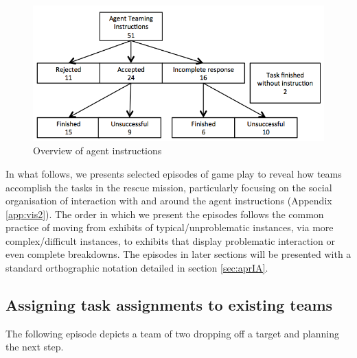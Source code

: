 \begin{figure}[ht]
 \includegraphics[width=1\textwidth]{img/study2/system/agentInstructions}
\caption{Overview of agent instructions}
\label{fig:study2agentInstructions}
\end{figure}

In what follows, we presents selected episodes of game play to reveal how teams accomplish the tasks in the rescue mission, particularly focusing on the social organisation of interaction with and around the agent instructions (Appendix \ref{app:vis2}). The order in which we present the episodes follows the common practice of moving from exhibits of typical/unproblematic instances, via more complex/difficult instances, to exhibits that display problematic interaction or even complete breakdowns. The episodes in later sections will be presented with a standard orthographic notation detailed in section \ref{sec:aprIA}.


\subsection{Assigning task assignments to existing teams}
The following episode depicts a team of two dropping off a target and planning the next step.\\

